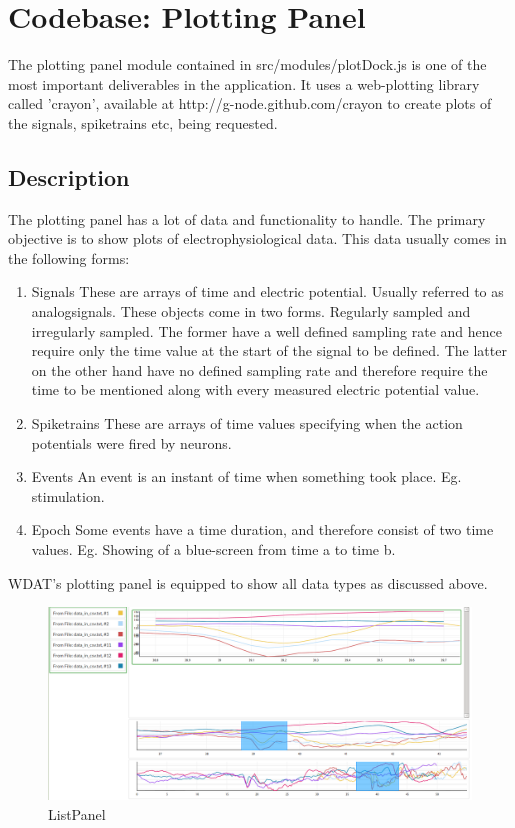 \chapter{Codebase: Plotting Panel}

The plotting panel module contained in src/modules/plotDock.js is one
of the most important deliverables in the application.  It uses a
web-plotting library called 'crayon', available at 
http://g-node.github.com/crayon to create plots of the signals,
spiketrains etc, being requested.

\section{Description}

The plotting panel has a lot of data and functionality to handle.  The
primary objective is to show plots of electrophysiological data.  This
data usually comes in the following forms:

\begin{enumerate}
  \item{Signals}
  These are arrays of time and electric potential.  Usually referred
  to as analogsignals.  These objects come in two forms.  Regularly
  sampled and irregularly sampled.  The former have a well defined
  sampling rate and hence require only the time value at the start of
  the signal to be defined.  The latter on the other hand have no
  defined sampling rate and therefore require the time to be mentioned
  along with every measured electric potential value.

  \item{Spiketrains}
  These are arrays of time values specifying when the action
  potentials were fired by neurons.

  \item{Events}
  An event is an instant of time when something took place.  Eg.
  stimulation.

  \item{Epoch}
  Some events have a time duration, and therefore consist of two time
  values. Eg. Showing of a blue-screen from time a to time b.
\end{enumerate}

WDAT's plotting panel is equipped to show all data types as discussed
above. 

\begin{figure}[h!t]
  \centering
  \includegraphics[width=\textwidth]{src/images/wdat-plotting-panel.png}
  \caption{ListPanel}
\end{figure}

